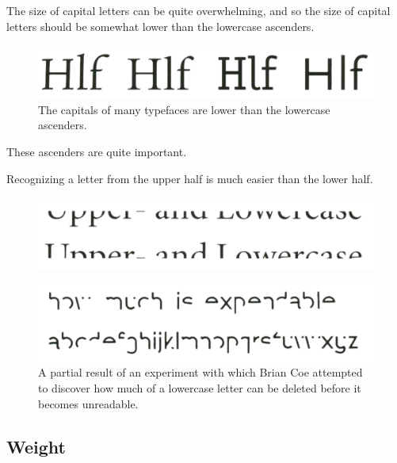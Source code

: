  \begin{theorem}
    The size of capital letters can be quite overwhelming, and so the size of capital letters should be somewhat lower than the lowercase ascenders. 

    \begin{figure}[H]
      \centering 
      \includegraphics[scale=0.4]{img/ascender.png}
      \caption{The capitals of many typefaces are lower than the lowercase ascenders.} 
      \label{fig:ascender}
    \end{figure}
  \end{theorem}

  These ascenders are quite important. 

  \begin{theorem}
    Recognizing a letter from the upper half is much easier than the lower half.
    \begin{figure}[H]
      \centering 
      \includegraphics[scale=0.4]{img/half_erased}
      \caption{} 
      \label{fig:half_erased}
    \end{figure}
  \end{theorem}

  \begin{figure}[H]
    \centering 
    \includegraphics[scale=0.4]{img/some_erased.png}
    \caption{A partial result of an experiment with which Brian Coe attempted to discover how much of a lowercase letter can be deleted before it becomes unreadable.} 
    \label{fig:some_erased}
  \end{figure}

\subsection{Weight}

